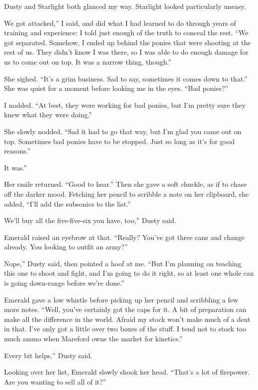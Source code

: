 Dusty and Starlight both glanced my way. Starlight looked particularly uneasy.

\leavevmode{}We got attacked,” I said, and did what I had learned to do through years of training and experience: I told just enough of the truth to conceal the rest. “We got separated. Somehow, I ended up behind the ponies that were shooting at the rest of us. They didn’t know I was there, so I was able to do enough damage for us to come out on top. It was a narrow thing, though.”

She sighed. “It’s a grim business. Sad to say, sometimes it comes down to that.” She was quiet for a moment before looking me in the eyes. “Bad ponies?”

I nodded. “At best, they were working for bad ponies, but I’m pretty sure they knew what they were doing.”

She slowly nodded. “Sad it had to go that way, but I’m glad you came out on top. Sometimes bad ponies have to be stopped. Just so long as it’s for good reasons.”

\leavevmode{}It was.”

Her smile returned. “Good to hear.” Then she gave a soft chuckle, as if to chase off the darker mood. Fetching her pencil to scribble a note on her clipboard, she added, “I’ll add the subsonics to the list.”

\leavevmode{}We’ll buy all the five-five-six you have, too,” Dusty said.

Emerald raised an eyebrow at that. “Really? You’ve got three cans and change already. You looking to outfit an army?”

\leavevmode{}Nope,” Dusty said, then pointed a hoof at me. “But I’m planning on teaching this one to shoot and fight, and I’m going to do it right, so at least one whole can is going down-range before we’re done.”

Emerald gave a low whistle before picking up her pencil and scribbling a few more notes. “Well, you’ve certainly got the caps for it. A bit of preparation can make all the difference in the world. Afraid my stock won’t make much of a dent in that. I’ve only got a little over two boxes of the stuff. I tend not to stock too much ammo when Mareford owns the market for kinetics.”

\leavevmode{}Every bit helps,” Dusty said.

Looking over her list, Emerald slowly shook her head. “That’s a lot of firepower. Are you wanting to sell all of it?”

